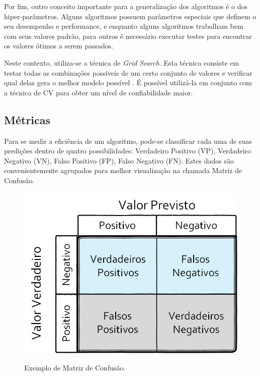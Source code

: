 Por fim, outro conceito importante para a generalização dos algoritmos é o dos hiper-parâmetros. Alguns algoritmos possuem parâmetros especiais que definem o seu desempenho e performance, e enquanto alguns algoritmos trabalham bem com seus valores padrão, para outros é necessário executar testes para encontrar os valores ótimos a serem passados. 

Neste contexto, utiliza-se a técnica de \textit{Grid Search}. Esta técnica consiste em testar todas as combinações possíveis de um certo conjunto de valores e verificar qual delas gera o melhor modelo possível \cite{bergstra2012random}.  É possível utilizá-la em conjunto com a técnica de CV para obter um nível de confiabilidade maior.

\subsection{Métricas}

Para se medir a eficiência de um algoritmo, pode-se classificar cada uma de suas predições dentro de quatro possibilidades: Verdadeiro Positivo (VP), Verdadeiro Negativo (VN), Falso Positivo (FP), Falso Negativo (FN). Estes dados são convenientemente agrupados para melhor visualização na chamada Matriz de Confusão. \cite{flach2003geometry}

\begin{figure}[h]
\caption{\small Exemplo de Matriz de Confusão.}
\centering
\includegraphics[scale=0.3]{figs/matrizconf.png}
\label{f.matriz-conf}
\end{figure}

